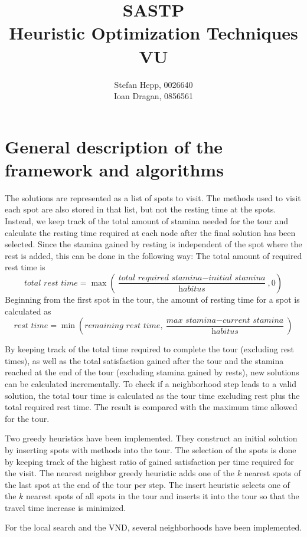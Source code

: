 \documentclass{article}
\title{SASTP \\
\small{Heuristic Optimization Techniques VU} }
\author{Stefan Hepp, 0026640 \\
Ioan Dragan, 0856561 }
\begin{document}
\maketitle
\section{General description of the framework and algorithms}

The solutions are represented as a list of spots to visit. The methods used to visit each spot are also stored in that list, but not the
resting time at the spots. Instead, we keep track of the total amount of stamina needed for the tour and calculate the resting time required 
at each node after the final solution has been selected. 
Since the stamina gained by resting is independent of the spot where the rest is added, this can be done in the following way: 
The total amount of required rest time is 
\[
\textit{total rest time} = \max\left(\frac{\textit{total required stamina} - \textit{initial stamina}}{\textit{habitus}},0\right)
\]
Beginning from the first spot in the tour, the amount of resting time for a spot is calculated as
\[
\textit{rest time} = \min\left(\textit{remaining rest time}, \frac{\textit{max stamina} - \textit{current stamina}}{\textit{habitus}}\right)
\]

By keeping track of the total time required to complete the tour (excluding rest times), as well as the total satisfaction gained after the tour and
the stamina reached at the end of the tour (excluding stamina gained by rests), new solutions can be calculated incrementally. 
To check if a neighborhood step leads to a valid solution, the total tour time is calculated as the tour time excluding rest plus
the total required rest time. The result is compared with the maximum time allowed for the tour.
\medskip

Two greedy heuristics have been implemented. They construct an initial solution by inserting spots with methods into the tour. The selection of the spots 
is done by keeping track of the highest ratio of gained satisfaction per time required for the visit.
The nearest neighbor greedy heuristic adds one of the $k$ nearest spots of the last spot at the end of the tour per step. The insert
heuristic selects one of the $k$ nearest spots of all spots in the tour and inserts it into the tour so that the travel time increase is minimized.
\medskip

For the local search and the VND, several neighborhoods have been implemented. 
\end{document}
